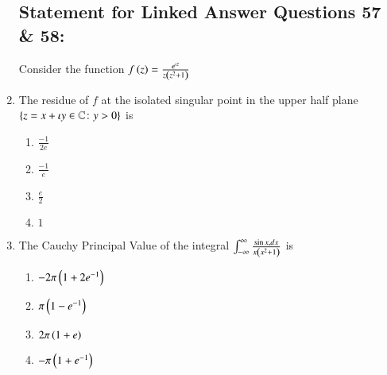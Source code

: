\documentclass[journal]{IEEEtran}
\begin{document}
\begin{enumerate}
\subsection*{Statement for Linked Answer Questions 57 \& 58:}
Consider the function $f\left(z\right) = \frac{e^{\iota z}}{z\left(z^2+1\right)}$
\item The residue of $f$ at the isolated singular point in the upper half plane $\left\{z = x+ \iota y \in \mathbb{C} \colon y > 0\right\}$ is
\begin{multicols}{2}
    \begin{enumerate}
        \item $\frac{-1}{2e}$
        \item $\frac{-1}{e}$
        \item $\frac{e}{2}$
        \item $1$
    \end{enumerate}
\end{multicols}
\item The Cauchy Principal Value of the integral $\int_{-\infty} ^ {\infty} \frac{\sin {x}, dx }{x\left(x^2 + 1\right)}$ is
\begin{multicols}{2}
    \begin{enumerate}
        \item $-2 \pi \left(1 + 2e^{-1}\right)$
        \item $\pi \left(1 - e ^{-1}\right)$
        \item $2 \pi \left(1+e\right)$
        \item $-\pi \left(1 + e^{-1}\right)$
    \end{enumerate}
\end{multicols}


\end{enumerate}
\end{document}
